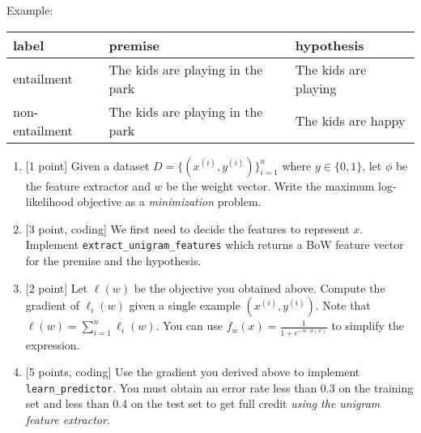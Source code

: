 \documentclass{article}
\theoremstyle{case}
\theoremstyle{definition}
\begin{document}
Example:
\begin{center}
    \begin{tabular}{lll}
        label & premise & hypothesis \\
        \hline
        entailment & The kids are playing in the park & The kids are playing \\
        non-entailment &The kids are playing in the park & The kids are happy 
    \end{tabular}
\end{center}

\begin{enumerate}
    \item {[1 point]} Given a dataset $D=\{(x^{(i)}, y^{(i)})\}_{i=1}^n$ where $y\in\{0,1\}$, let $\phi$ be the feature extractor and $w$ be the weight vector. Write the maximum log-likelihood objective as a \textit{minimization} problem.
    \begin{shaded}
        
    \end{shaded}

    \newpage
    \item {[3 point, coding]} We first need to decide the features to represent $x$.
        Implement \texttt{extract\_unigram\_features} which returns a BoW feature vector for the premise and the hypothesis.
        \begin{shaded}

        \end{shaded}

    \newpage
    \item {[2 point]} Let $\ell(w)$ be the objective you obtained above.
    Compute the gradient of $\ell_i(w)$ given a single example $(x^{(i)}, y^{(i)})$.
        Note that $\ell(w) = \sum_{i=1}^n \ell_i(w)$.
        You can use $f_w(x) = \frac{1}{1 + e^{-w\cdot\phi(x)}}$
        to simplify the expression.
    \begin{shaded}
        
    \end{shaded}

    \newpage
    \item {[5 points, coding]} Use the gradient you derived above to implement \texttt{learn\_predictor}.
        You must obtain an error rate less than 0.3 on the training set and less than 0.4 on the test set to get full credit \emph{using the unigram feature extractor}.
        \begin{shaded}
            

\end{shaded}
\end{enumerate}
\end{document}
